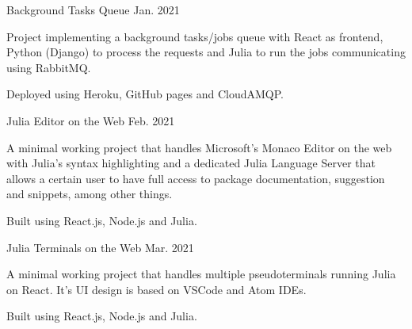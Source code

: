 

\begin{cventries}

  \projectentry
    {} %
    {
    Background Tasks Queue 
    \href{https://mattborghi.github.io/projects/Background\%20Task\%20Queues/}{\faGithub}
    } %
    {} %
    {Jan. 2021} %
    {
      \begin{cvitems} %
          \item {Project implementing a background tasks/jobs queue with React as frontend, Python (Django) to process the requests and Julia to run the jobs communicating using RabbitMQ.}
          \item{Deployed using Heroku, GitHub pages and CloudAMQP.}
      \end{cvitems}
    }

  \projectentry
    {} %
    {
    Julia Editor on the Web 
    \href{https://mattborghi.github.io/projects/Julia\%20Editor\%20on\%20the\%20Web/}{\faGithub}
    } %
    {} %
    {Feb. 2021} %
    {
      \begin{cvitems} %
        \item{A minimal working project that handles Microsoft’s Monaco Editor on the web with Julia’s syntax highlighting and a dedicated Julia Language Server that allows a certain user to have full access to package documentation, suggestion and snippets, among other things.}
        \item{Built using React.js, Node.js and Julia.}
      \end{cvitems}
    }


  \projectentry
    {} %
    {
    Julia Terminals on the Web 
    \href{https://mattborghi.github.io/projects/Julia\%20Terminal\%20Web/}{\faGithub}
    } %
    {} %
    {Mar. 2021} %
    {
      \begin{cvitems} %
        \item {A minimal working project that handles multiple pseudoterminals running Julia on React. It’s UI design is based on VSCode and Atom IDEs.}
        \item{Built using React.js, Node.js and Julia.}
      \end{cvitems}
    }

\end{cventries}
